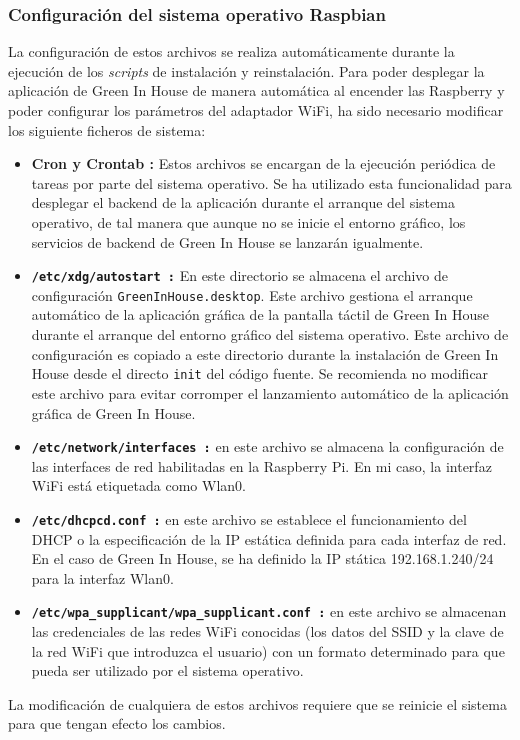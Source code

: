         \subsubsection{Configuración del sistema operativo Raspbian}
        La configuración de estos archivos se realiza automáticamente durante la ejecución de los \textit{scripts} de instalación y reinstalación. Para poder desplegar la aplicación de Green In House de manera automática al encender las Raspberry y poder configurar los parámetros del adaptador WiFi, ha sido necesario modificar los siguiente ficheros de sistema: 
        \begin{itemize}
            \item \textbf{Cron y Crontab :} Estos archivos se encargan de la ejecución periódica de tareas por parte del sistema operativo. Se ha utilizado esta funcionalidad para desplegar el backend de la aplicación durante el arranque del sistema operativo, de tal manera que aunque no se inicie el entorno gráfico, los servicios de backend de Green In House se lanzarán igualmente.
            \item \textbf{\texttt{/etc/xdg/autostart :}} En este directorio se almacena el archivo de configuración \texttt{GreenInHouse.desktop}. Este archivo gestiona el arranque automático de la aplicación gráfica de la pantalla táctil de Green In House durante el arranque del entorno gráfico del sistema operativo. Este archivo de configuración es copiado a este directorio durante la instalación de Green In House desde el directo \texttt{init} del código fuente. Se recomienda no modificar este archivo para evitar corromper el lanzamiento automático de la aplicación gráfica de Green In House.
            \item \textbf{\texttt{/etc/network/interfaces :}} en este archivo se almacena la configuración de las interfaces de red habilitadas en la Raspberry Pi. En mi caso, la interfaz WiFi está etiquetada como Wlan0.
            \item \textbf{\texttt{/etc/dhcpcd.conf :}} en este archivo se establece el funcionamiento del DHCP o la especificación de la IP estática definida para cada interfaz de red. En el caso de Green In House, se ha definido la IP stática 192.168.1.240/24 para la interfaz Wlan0.
            \item \textbf{\texttt{/etc/wpa\_supplicant/wpa\_supplicant.conf :}} en este archivo se almacenan las credenciales de las redes WiFi conocidas (los datos del SSID y la clave de la red WiFi que introduzca el usuario) con un formato determinado para que pueda ser utilizado por el sistema operativo.
        \end{itemize}
        La modificación de cualquiera de estos archivos requiere que se reinicie el sistema para que tengan efecto los cambios.

